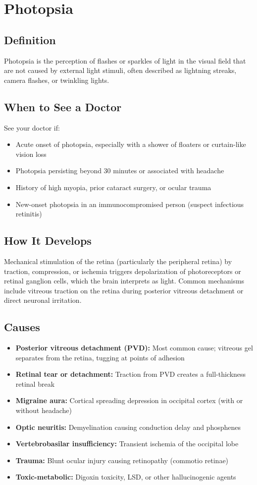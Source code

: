 \chapter{Photopsia}

\section*{Definition}
Photopsia is the perception of flashes or sparkles of light in the visual field that are not caused by external light stimuli, often described as lightning streaks, camera flashes, or twinkling lights.

\section*{When to See a Doctor}
See your doctor if:
\begin{itemize}
  \item Acute onset of photopsia, especially with a shower of floaters or curtain-like vision loss
  \item Photopsia persisting beyond 30 minutes or associated with headache
  \item History of high myopia, prior cataract surgery, or ocular trauma
  \item New-onset photopsia in an immunocompromised person (suspect infectious retinitis)
\end{itemize}

\section*{How It Develops}
Mechanical stimulation of the retina (particularly the peripheral retina) by traction, compression, or ischemia triggers depolarization of photoreceptors or retinal ganglion cells, which the brain interprets as light. Common mechanisms include vitreous traction on the retina during posterior vitreous detachment or direct neuronal irritation.

\section*{Causes}
\begin{itemize}
  \item \textbf{Posterior vitreous detachment (PVD):} Most common cause; vitreous gel separates from the retina, tugging at points of adhesion
  \item \textbf{Retinal tear or detachment:} Traction from PVD creates a full-thickness retinal break
  \item \textbf{Migraine aura:} Cortical spreading depression in occipital cortex (with or without headache)
  \item \textbf{Optic neuritis:} Demyelination causing conduction delay and phosphenes
  \item \textbf{Vertebrobasilar insufficiency:} Transient ischemia of the occipital lobe
  \item \textbf{Trauma:} Blunt ocular injury causing retinopathy (commotio retinae)
  \item \textbf{Toxic-metabolic:} Digoxin toxicity, LSD, or other hallucinogenic agents
\end{itemize}

